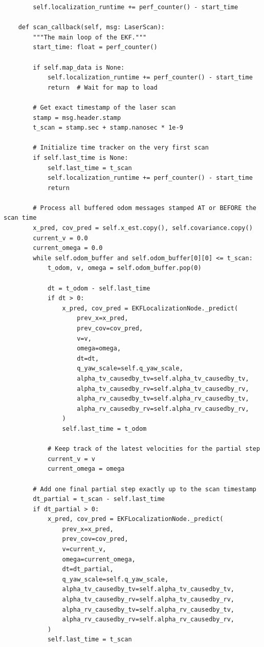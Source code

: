 \begin{verbatim}
        self.localization_runtime += perf_counter() - start_time

    def scan_callback(self, msg: LaserScan):
        """The main loop of the EKF."""
        start_time: float = perf_counter()

        if self.map_data is None:
            self.localization_runtime += perf_counter() - start_time
            return  # Wait for map to load

        # Get exact timestamp of the laser scan
        stamp = msg.header.stamp
        t_scan = stamp.sec + stamp.nanosec * 1e-9

        # Initialize time tracker on the very first scan
        if self.last_time is None:
            self.last_time = t_scan
            self.localization_runtime += perf_counter() - start_time
            return

        # Process all buffered odom messages stamped AT or BEFORE the scan time
        x_pred, cov_pred = self.x_est.copy(), self.covariance.copy()
        current_v = 0.0
        current_omega = 0.0
        while self.odom_buffer and self.odom_buffer[0][0] <= t_scan:
            t_odom, v, omega = self.odom_buffer.pop(0)

            dt = t_odom - self.last_time
            if dt > 0:
                x_pred, cov_pred = EKFLocalizationNode._predict(
                    prev_x=x_pred,
                    prev_cov=cov_pred,
                    v=v,
                    omega=omega,
                    dt=dt,
                    q_yaw_scale=self.q_yaw_scale,
                    alpha_tv_causedby_tv=self.alpha_tv_causedby_tv,
                    alpha_tv_causedby_rv=self.alpha_tv_causedby_rv,
                    alpha_rv_causedby_tv=self.alpha_rv_causedby_tv,
                    alpha_rv_causedby_rv=self.alpha_rv_causedby_rv,
                )
                self.last_time = t_odom

            # Keep track of the latest velocities for the partial step
            current_v = v
            current_omega = omega

        # Add one final partial step exactly up to the scan timestamp
        dt_partial = t_scan - self.last_time
        if dt_partial > 0:
            x_pred, cov_pred = EKFLocalizationNode._predict(
                prev_x=x_pred,
                prev_cov=cov_pred,
                v=current_v,
                omega=current_omega,
                dt=dt_partial,
                q_yaw_scale=self.q_yaw_scale,
                alpha_tv_causedby_tv=self.alpha_tv_causedby_tv,
                alpha_tv_causedby_rv=self.alpha_tv_causedby_rv,
                alpha_rv_causedby_tv=self.alpha_rv_causedby_tv,
                alpha_rv_causedby_rv=self.alpha_rv_causedby_rv,
            )
            self.last_time = t_scan


\end{verbatim}
